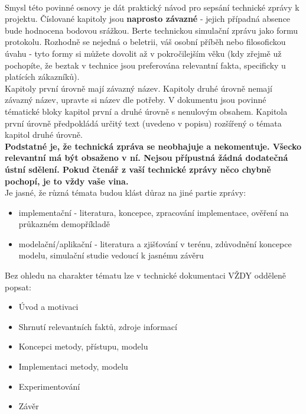 \documentclass{article}
\begin{document}
    \\
Smysl této povinné osnovy je dát praktický návod pro sepsání technické
zprávy k projektu. Číslované kapitoly jsou \textbf{naprosto závazné} -
jejich případná absence bude hodnocena bodovou srážkou. Berte technickou
simulační zprávu jako formu protokolu. Rozhodně se nejedná o beletrii,
váš osobní příběh nebo filosofickou úvahu - tyto formy si můžete dovolit
až v pokročilejším věku (kdy zřejmě už pochopíte, že beztak v technice
jsou preferována relevantní fakta, specificky u platících
zákazníků).\\[2\baselineskip]Kapitoly první úrovně mají závazný název.
Kapitoly druhé úrovně nemají závazný název, upravte si název dle
potřeby. V dokumentu jsou povinné tématické bloky kapitol první a druhé
úrovně s nenulovým obsahem. Kapitola první úrovně předpokládá určitý
text (uvedeno v popisu) rozšířený o témata kapitol druhé
úrovně.\\[2\baselineskip]\textbf{Podstatné je, že technická zpráva se
neobhajuje a nekomentuje. Všecko relevantní má být obsaženo v ní. Nejsou
přípustná žádná dodatečná ústní sdělení. Pokud čtenář z vaší technické
zprávy něco chybně pochopí, je to vždy vaše vina.}\\[2\baselineskip]Je
jasné, že různá témata budou klást důraz na jiné partie zprávy:\\

\begin{itemize}
\tightlist
\item
  implementační - literatura, koncepce, zpracování implementace, ověření
  na průkazném demopříkladě
\item
  modelační/aplikační - literatura a zjišťování v terénu, zdůvodnění
  koncepce modelu, simulační studie vedoucí k jasnému závěru
\end{itemize}

Bez ohledu na charakter tématu lze v technické dokumentaci VŽDY odděleně
popsat:\\

\begin{itemize}
\tightlist
\item
  Úvod a motivaci
\item
  Shrnutí relevantních faktů, zdroje informací
\item
  Koncepci metody, přístupu, modelu
\item
  Implementaci metody, modelu
\item
  Experimentování
\item
  Závěr
\end{itemize}
\end{document}
